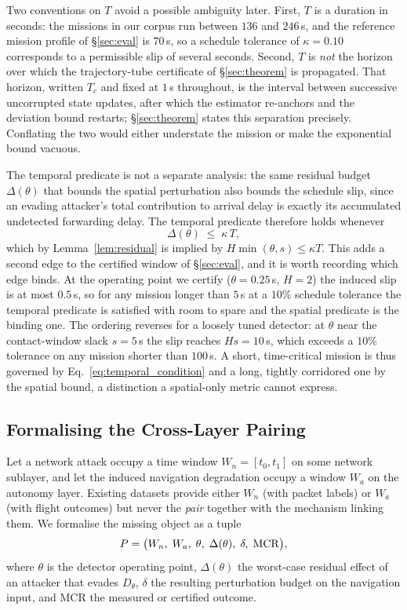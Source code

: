 Two conventions on $T$ avoid a possible ambiguity later. First, $T$ is a
duration in seconds: the missions in our corpus run between $136$ and $246$\,s,
and the reference mission profile of \S\ref{sec:eval} is $70$\,s, so a schedule
tolerance of $\kappa=0.10$ corresponds to a permissible slip of several seconds.
Second, $T$ is \emph{not} the horizon over which the trajectory-tube certificate
of \S\ref{sec:theorem} is propagated. That horizon, written $T_c$ and fixed at
$1$\,s throughout, is the interval between successive uncorrupted state updates,
after which the estimator re-anchors and the deviation bound restarts;
\S\ref{sec:theorem} states this separation precisely. Conflating the two would
either understate the mission or make the exponential bound vacuous.

The temporal predicate is not a separate analysis: the same residual budget
$\Delta(\theta)$ that bounds the spatial perturbation also bounds the schedule
slip, since an evading attacker's total contribution to arrival delay is exactly
its accumulated undetected forwarding delay. The temporal predicate therefore
holds whenever
\begin{equation}
\label{eq:temporal_condition}
\Delta(\theta)\;\le\;\kappa\,T ,
\end{equation}
which by Lemma~\ref{lem:residual} is implied by $H\min(\theta,s)\le\kappa T$.
This adds a second edge to the certified window of \S\ref{sec:eval}, and it is
worth recording which edge binds. At the operating point we certify
($\theta=0.25$\,s, $H=2$) the induced slip is at most $0.5$\,s, so for any
mission longer than $5$\,s at a $10\%$ schedule tolerance the temporal predicate
is satisfied with room to spare and the spatial predicate is the binding one.
The ordering reverses for a loosely tuned detector: at $\theta$ near the
contact-window slack $s=5$\,s the slip reaches $H s = 10$\,s, which exceeds a
$10\%$ tolerance on any mission shorter than $100$\,s. A short, time-critical
mission is thus governed by Eq.~\eqref{eq:temporal_condition} and a long,
tightly corridored one by the spatial bound, a distinction a spatial-only
metric cannot express.

\subsection{Formalising the Cross-Layer Pairing}
\label{sec:formulation}
Let a network attack occupy a time window $W_n=[t_0,t_1]$ on some network
sublayer, and let the induced navigation degradation occupy a window $W_a$ on
the autonomy layer. Existing datasets provide either $W_n$ (with packet labels)
or $W_a$ (with flight outcomes) but never the \emph{pair} together with the
mechanism linking them. We formalise the missing object as a tuple
\begin{equation}
\label{eq:pairing}
P = \big(W_n,\; W_a,\; \theta,\; \Delta(\theta),\; \delta,\; \mathrm{MCR}\big),
\end{equation}
where $\theta$ is the detector operating point, $\Delta(\theta)$ the worst-case
residual effect of an attacker that evades $D_\theta$, $\delta$ the resulting
perturbation budget on the navigation input, and MCR the measured or certified
outcome.

